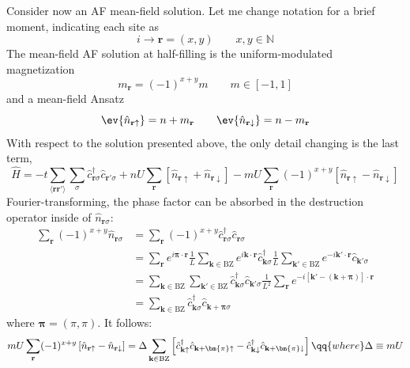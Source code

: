 Consider now an AF mean-field solution. Let me change notation for a brief moment, indicating each site as
\[
	i \to \mathbf{r} = (x,y)
	\qquad
	x,y \in \mathbb{N}
\]
The mean-field AF solution at half-filling is the uniform-modulated magnetization
\[
	m_\mathbf{r} = (-1)^{x+y} m
	\qquad
	m \in [-1,1]
\]
and a mean-field Ansatz
\begin{equation}\label{appeq:af-mean-field-ansatz}
	\ev{\hat n_{\mathbf{r}\uparrow}} = n+m_\mathbf{r}
	\qquad
	\ev{\hat n_{\mathbf{r}\downarrow}} = n-m_\mathbf{r}
\end{equation}
With respect to the solution presented above, the only detail changing is the last term,
\begin{equation}\label{appeq:hubbard-mean-field-hamiltonian}
	\hat H = -t \sum_{\langle \mathbf{r}\mathbf{r}' \rangle} \sum_\sigma \hat c_{\mathbf{r}\sigma}^\dagger \hat c_{\mathbf{r}'\sigma}
	+ nU \sum_\mathbf{r} \left[
		\hat n_{\mathbf{r}\uparrow} + \hat n_{\mathbf{r}\downarrow}
	\right] - mU \sum_\mathbf{r} (-1)^{x+y} \left[
		\hat n_{\mathbf{r}\uparrow} - \hat n_{\mathbf{r}\downarrow}
	\right]
\end{equation}
Fourier-transforming, the phase factor can be absorbed in the destruction operator inside of $\hat n_{\mathbf{r}\sigma}$:
\[
\begin{aligned}
	\sum_\mathbf{r} (-1)^{x+y} \hat n_{\mathbf{r}\sigma} &= \sum_\mathbf{r} (-1)^{x+y} \hat c_{\mathbf{r}\sigma}^\dagger \hat c_{\mathbf{r}\sigma} \\
	&= 
	\sum_\mathbf{r} e^{i \bm{\pi} \cdot \mathbf{r}}
	\frac{1}{L} \sum_{\mathbf{k} \in \mathrm{BZ}} e^{i \mathbf{k} \cdot \mathbf{r}} \hat c_{\mathbf{k}\sigma}^\dagger \frac{1}{L} \sum_{\mathbf{k}' \in \mathrm{BZ}} e^{-i \mathbf{k}' \cdot \mathbf{r}} \hat c_{\mathbf{k}'\sigma} \\
	&= \sum_{\mathbf{k} \in \mathrm{BZ}} \sum_{\mathbf{k}' \in \mathrm{BZ}} \hat c_{\mathbf{k}\sigma}^\dagger \hat c_{\mathbf{k}'\sigma} \frac{1}{L^2} \sum_\mathbf{r} e^{-i [\mathbf{k}' - (\mathbf{k} + \bm{\pi}) ] \cdot \mathbf{r}} \\
	&= \sum_{\mathbf{k} \in \mathrm{BZ}} \hat c_{\mathbf{k}\sigma}^\dagger \hat c_{\mathbf{k}+\bm{\pi}\sigma}
\end{aligned}
\]
where $\bm{\pi} = (\pi,\pi)$. It follows:
\[
mU \sum_\mathbf{r} (-1)^{x+y} \left[
		\hat n_{\mathbf{r}\uparrow} - \hat n_{\mathbf{r}\downarrow}
	\right] = \Delta \sum_{\mathbf{k} \in \mathrm{BZ}} \left[
		\hat c_{\mathbf{k}\uparrow}^\dagger \hat c_{\mathbf{k}+\bm{\pi}\uparrow} - \hat c_{\mathbf{k}\downarrow}^\dagger \hat c_{\mathbf{k}+\bm{\pi}\downarrow}
	\right]
	\qq{where}
	\Delta \equiv mU
\]

